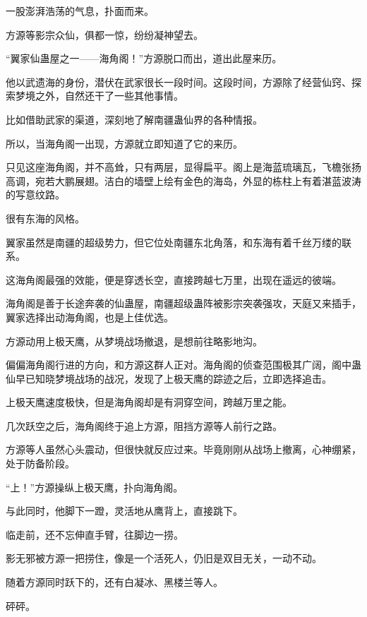 
\begin{this_body}



一股澎湃浩荡的气息，扑面而来。

方源等影宗众仙，俱都一惊，纷纷凝神望去。

“翼家仙蛊屋之一——海角阁！”方源脱口而出，道出此屋来历。

他以武遗海的身份，潜伏在武家很长一段时间。这段时间，方源除了经营仙窍、探索梦境之外，自然还干了一些其他事情。

比如借助武家的渠道，深刻地了解南疆蛊仙界的各种情报。

所以，当海角阁一出现，方源就立即知道了它的来历。

只见这座海角阁，并不高耸，只有两层，显得扁平。阁上是海蓝琉璃瓦，飞檐张扬高调，宛若大鹏展翅。洁白的墙壁上绘有金色的海岛，外显的栋柱上有着湛蓝波涛的写意纹路。

很有东海的风格。

翼家虽然是南疆的超级势力，但它位处南疆东北角落，和东海有着千丝万缕的联系。

这海角阁最强的效能，便是穿透长空，直接跨越七万里，出现在遥远的彼端。

海角阁是善于长途奔袭的仙蛊屋，南疆超级蛊阵被影宗突袭强攻，天庭又来插手，翼家选择出动海角阁，也是上佳优选。

方源动用上极天鹰，从梦境战场撤退，是想前往略影地沟。

偏偏海角阁行进的方向，和方源这群人正对。海角阁的侦查范围极其广阔，阁中蛊仙早已知晓梦境战场的战况，发现了上极天鹰的踪迹之后，立即选择追击。

上极天鹰速度极快，但是海角阁却是有洞穿空间，跨越万里之能。

几次跃空之后，海角阁终于追上方源，阻挡方源等人前行之路。

方源等人虽然心头震动，但很快就反应过来。毕竟刚刚从战场上撤离，心神绷紧，处于防备阶段。

“上！”方源操纵上极天鹰，扑向海角阁。

与此同时，他脚下一蹬，灵活地从鹰背上，直接跳下。

临走前，还不忘伸直手臂，往脚边一捞。

影无邪被方源一把捞住，像是一个活死人，仍旧是双目无关，一动不动。

随着方源同时跃下的，还有白凝冰、黑楼兰等人。

砰砰。


\end{this_body}
